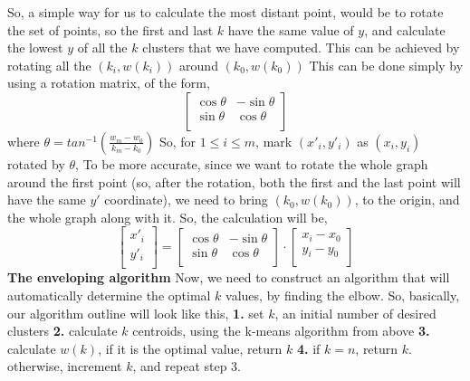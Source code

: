 \documentclass[12pt]{article}
\begin{document}
So, a simple way for us to calculate the most distant point, would be to rotate the set of points, \newline
so the first and last $k$ have the same value of $y$, and calculate the lowest $y$ of all the $k$ clusters
that we have computed. \newline
This can be achieved by rotating all the $(k_i,w(k_i))$ around $(k_0,w(k_0))$ \newline
This can be done simply by using a rotation matrix, of the form,
$$
\begin{bmatrix}
\cos\theta & -\sin\theta \\
\sin\theta & \cos\theta \\
\end{bmatrix}
$$
where $\theta=tan^{-1}(\frac{w_m-w_0}{k_m-k_0})$ \newline
So, for $1 \leq i \leq m$, mark $(x'_i,y'_i)$ as $(x_i,y_i)$ rotated by $\theta$, \newline
To be more accurate, since we want to rotate the whole graph around the first point \newline
(so, after the rotation, both the first and the last point will have the same $y'$ coordinate), \newline
we need to bring $(k_0,w(k_0))$, to the origin, and the whole graph along with it. \newline
So, the calculation will be, \newline
$$
\begin{bmatrix}
x'_i \\
y'_i \\
\end{bmatrix}=\begin{bmatrix}
\cos\theta & -\sin\theta \\
\sin\theta & \cos\theta \\
\end{bmatrix} \cdot \begin{bmatrix}
x_i-x_0 \\
y_i-y_0 \\
\end{bmatrix}
$$
\newpage
\textbf{The enveloping algorithm}
Now, we need to construct an algorithm that will automatically determine the optimal $k$ values, by finding the elbow. So, basically, our algorithm outline will look like this, \newline
\textbf{1.} set $k$, an initial number of desired clusters \newline
\textbf{2.} calculate $k$ centroids, using the k-means algorithm from above \newline
\textbf{3.} calculate $w(k)$, if it is the optimal value, return $k$ \newline
\textbf{4.} if $k=n$, return $k$. otherwise, increment $k$, and repeat step 3. \newline
\end{document}
